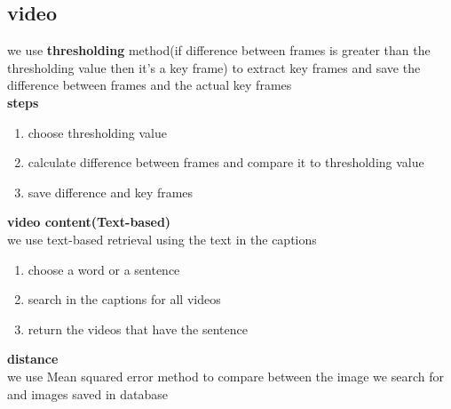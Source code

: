 \documentclass[pdftex,10pt,a4paper,oneside]{article}
\begin{document}
\subsection{video }
we use \textbf{thresholding} method(if difference between frames is greater than the thresholding value then it’s a key frame)  to extract key frames and  save the difference  between frames and the actual key frames\\
\textbf{{\large steps}}\\
\begin{enumerate}
	\item choose thresholding value
	\item	calculate difference between frames and compare it to thresholding value 
	\item	save difference and key frames
	
\end{enumerate}
	\textbf{video content(Text-based)}\\
	we use text-based retrieval using the text in the captions \\
	\begin{enumerate}
		\item choose a word or a sentence
		\item	search in the captions for all videos
		\item	return the videos that have the sentence
	\end{enumerate}
	
	\textbf{{\large distance}}\\
	we use Mean squared error method to compare between the image we search for and images saved in database 
	
	\pagebreak
\end{document}
